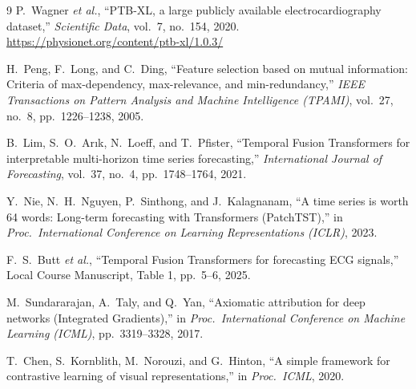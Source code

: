 \documentclass[11pt,a4paper]{article}
\begin{document}
\begin{thebibliography}{9}
P.\ Wagner \emph{et al.}, ``PTB-XL, a large publicly available electrocardiography dataset,'' \emph{Scientific Data}, vol.\ 7, no.\ 154, 2020. \url{https://physionet.org/content/ptb-xl/1.0.3/}

H.\ Peng, F.\ Long, and C.\ Ding, ``Feature selection based on mutual information: Criteria of max-dependency, max-relevance, and min-redundancy,'' \emph{IEEE Transactions on Pattern Analysis and Machine Intelligence (TPAMI)}, vol.\ 27, no.\ 8, pp.\ 1226--1238, 2005.

B.\ Lim, S.\ O.\ Ar{\i}k, N.\ Loeff, and T.\ Pfister, ``Temporal Fusion Transformers for interpretable multi-horizon time series forecasting,'' \emph{International Journal of Forecasting}, vol.\ 37, no.\ 4, pp.\ 1748--1764, 2021.

Y.\ Nie, N.\ H.\ Nguyen, P.\ Sinthong, and J.\ Kalagnanam, ``A time series is worth 64 words: Long-term forecasting with Transformers (PatchTST),'' in \emph{Proc.\ International Conference on Learning Representations (ICLR)}, 2023.

F.\ S.\ Butt \emph{et al.}, ``Temporal Fusion Transformers for forecasting ECG signals,'' Local Course Manuscript, Table 1, pp.\ 5--6, 2025.

M.\ Sundararajan, A.\ Taly, and Q.\ Yan, ``Axiomatic attribution for deep networks (Integrated Gradients),'' in \emph{Proc.\ International Conference on Machine Learning (ICML)}, pp.\ 3319--3328, 2017.

T.\ Chen, S.\ Kornblith, M.\ Norouzi, and G.\ Hinton, ``A simple framework for contrastive learning of visual representations,'' in \emph{Proc.\ ICML}, 2020.
\end{thebibliography}
\end{document}

